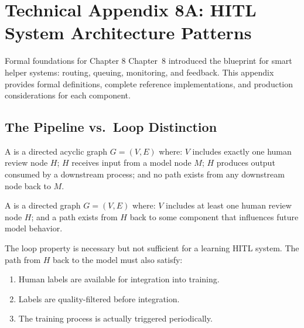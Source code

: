 
\chapter*{Technical Appendix 8A: HITL System Architecture Patterns}

\begin{chapterquote}{Formal foundations for Chapter 8}
Chapter~8 introduced the blueprint for smart helper systems: routing, queuing, monitoring, and feedback. This appendix provides formal definitions, complete reference implementations, and production considerations for each component.
\end{chapterquote}

\apxnumon
\section{The Pipeline vs.\ Loop Distinction}

A  is a directed acyclic graph $G = (V, E)$ where: $V$ includes exactly one human review node $H$; $H$ receives input from a model node $M$; $H$ produces output consumed by a downstream process; and no path exists from any downstream node back to $M$.

A  is a directed graph $G = (V, E)$ where: $V$ includes at least one human review node $H$; and a path exists from $H$ back to some component that influences future model behavior.

The loop property is necessary but not sufficient for a learning HITL system. The path from $H$ back to the model must also satisfy:
\begin{enumerate}
    \item Human labels are available for integration into training.
    \item Labels are quality-filtered before integration.
    \item The training process is actually triggered periodically.
\end{enumerate}

